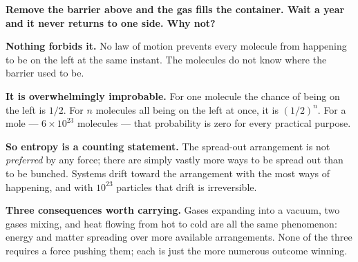 \documentclass{apchem-worksheet}
\begin{document}
\begin{workedexample}
\textbf{Remove the barrier above and the gas fills the container. Wait
a year and it never returns to one side. Why not?}

\textbf{Nothing forbids it.} No law of motion prevents every molecule
from happening to be on the left at the same instant. The molecules do
not know where the barrier used to be.

\textbf{It is overwhelmingly improbable.} For one molecule the chance
of being on the left is $1/2$. For $n$ molecules all being on the left
at once, it is $(1/2)^{n}$. For a mole --- $6 \times 10^{23}$ molecules
--- that probability is zero for every practical purpose.

\textbf{So entropy is a counting statement.} The spread-out
arrangement is not \emph{preferred} by any force; there are simply
vastly more ways to be spread out than to be bunched. Systems drift
toward the arrangement with the most ways of happening, and with $10^{23}$
particles that drift is irreversible.

\textbf{Three consequences worth carrying.} Gases expanding into a
vacuum, two gases mixing, and heat flowing from hot to cold are all the
same phenomenon: energy and matter spreading over more available
arrangements. None of the three requires a force pushing them; each is
just the more numerous outcome winning.
\end{workedexample}
\end{document}
